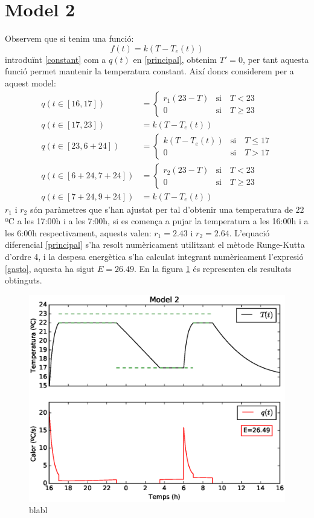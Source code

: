 \documentclass[11pt]{article}
\begin{document}
	\section{Model 2}
	Observem que si tenim una funció:
	\begin{equation}\label{constant}
		f(t)=k(T-T_e(t))
	\end{equation}
	introduïnt \eqref{constant} com a $q(t)$ en \eqref{principal}, obtenim $T'=0$, per tant aquesta funció permet mantenir la temperatura constant. Així doncs considerem per a aquest model:
	\begin{align} 
	q(t\in[16,17])&=
	\begin{cases}
	r_1(23-T)&\text{si}\quad T<23\\
	0&\text{si}\quad T\geq23
	\end{cases}
	\\
	q(t\in[17,23])&=k(T-T_e(t))\\
	q(t\in[23,6+24])&=
	\begin{cases}
	k(T-T_e(t))&\text{si}\quad T\leq17\\
	0&\text{si}\quad T>17
	\end{cases}
	\\
		q(t\in[6+24,7+24])&=
		\begin{cases}
		r_2(23-T)&\text{si}\quad T<23\\
		0&\text{si}\quad T\geq23
		\end{cases}
		\\
	q(t\in[7+24,9+24])&=k(T-T_e(t))
	\end{align}
	$r_1$ i $r_2$ són paràmetres que s'han ajustat per tal d'obtenir una temperatura de $22$ºC a les 17:00h i a les 7:00h, si es comença a pujar la temperatura a les 16:00h i a les 6:00h respectivament, aquests valen: $r_1=2.43$ i $r_2=2.64$. L'equació diferencial \eqref{principal} s'ha resolt numèricament utilitzant el mètode Runge-Kutta d'ordre 4, i la despesa energètica s'ha calculat integrant numèricament l'expresió \eqref{gasto}, aquesta ha sigut $E=26.49$. En la figura \ref{figmodel2} és representen els resultats obtinguts.
	\begin{figure}[h!]
		\centering
		\includegraphics[width=12cm]{model2.eps}
		\caption{blabl}
		\label{figmodel2}
	\end{figure}
\end{document}
